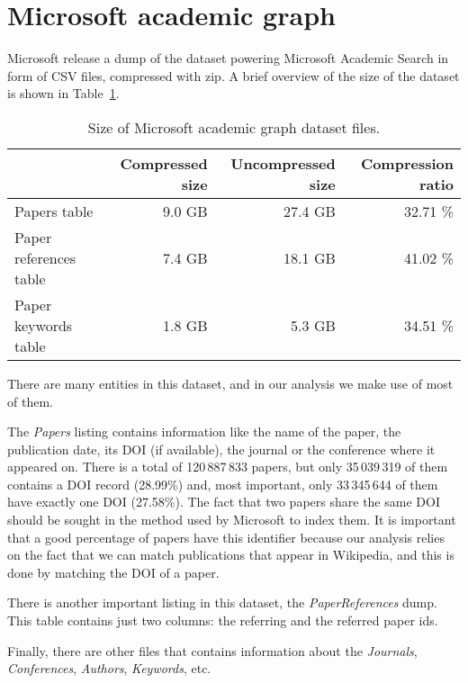 \section{Microsoft academic graph}
\label{sec:mag_dataset}
Microsoft release a dump of the dataset powering Microsoft Academic Search in form of CSV files, compressed with zip.
A brief overview of the size of the dataset is shown in Table~\ref{tbl:mag_size}.

\begin{table}[]
\centering
\caption{Size of Microsoft academic graph dataset files.}
\label{tbl:mag_size}
\begin{tabular}{@{}lrrr@{}}
\multicolumn{1}{c}{\textbf{}} & \textbf{Compressed size} & \textbf{Uncompressed size} & \textbf{Compression ratio} \\ \midrule
Papers table                &      9.0 GB &    27.4 GB & 32.71 \% \\
Paper references table      &      7.4 GB &    18.1 GB & 41.02 \% \\
Paper keywords table        &      1.8 GB &     5.3 GB & 34.51 \%
\end{tabular}
\end{table}

There are many entities in this dataset, and in our analysis we make use of most of them.

The \emph{Papers} listing contains information like the name of the paper, the publication date, its \ac{DOI} (if available), the journal or the conference where it appeared on.
There is a total of 120\,887\,833 papers, but only 35\,039\,319 of them contains a \ac{DOI} record (28.99\%) and, most important, only 33\,345\,644 of them have exactly one \ac{DOI} (27.58\%).
The fact that two papers share the same \ac{DOI} should be sought in the method used by Microsoft to index them.
It is important that a good percentage of papers have this identifier because our analysis relies on the fact that we can match publications that appear in Wikipedia, and this is done by matching the \ac{DOI} of a paper.

There is another important listing in this dataset, the \emph{PaperReferences} dump.
This table contains just two columns: the referring and the referred paper ids.

Finally, there are other files that contains information about the \emph{Journals}, \emph{Conferences}, \emph{Authors}, \emph{Keywords}, etc.




